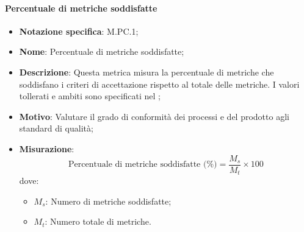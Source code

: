 \paragraph*{Percentuale di metriche soddisfatte}
\begin{itemize}
    \item \textbf{Notazione specifica}: M.PC.1;
    \item \textbf{Nome}: Percentuale di metriche soddisfatte;
    \item \textbf{Descrizione}: Questa metrica misura la percentuale di metriche che soddisfano i criteri di accettazione rispetto al totale delle metriche. I valori tollerati e ambiti sono specificati nel \PianoDiQualifica;
    \item \textbf{Motivo}: Valutare il grado di conformità dei processi e del prodotto agli standard di qualità;
    \item \textbf{Misurazione}:
    \[
        \text{Percentuale di metriche soddisfatte (\%)} = \frac{M_{s}}{M_{t}} \times 100 
    \]
    dove:
    \begin{itemize}
        \item $M_{s}$: Numero di metriche soddisfatte;
        \item $M_{t}$: Numero totale di metriche.
    \end{itemize}
\end{itemize}
